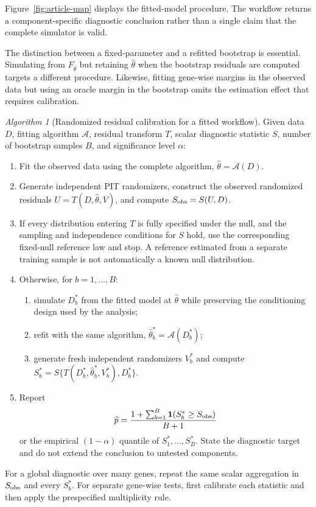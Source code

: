 \documentclass[preprint,12pt]{elsarticle}
\theoremstyle{plain}
\theoremstyle{remark}
\newtheorem{algorithm}{Algorithm}
\begin{document}
Figure~\ref{fig:article-map} displays the fitted-model procedure. The workflow
returns a component-specific diagnostic conclusion rather than a single claim
that the complete simulator is valid.

The distinction between a fixed-parameter and a refitted bootstrap is
essential. Simulating from $F_{\widehat\theta}$ but retaining
$\widehat\theta$ when the bootstrap residuals are computed targets a different
procedure. Likewise, fitting gene-wise margins in the observed data but using
an oracle margin in the bootstrap omits the estimation effect that requires
calibration.

\par\noindent
\begin{minipage}{\linewidth}
\begin{algorithm}[Randomized residual calibration for a fitted workflow]
\label{alg:workflow}
Given data $D$, fitting algorithm $\mathcal A$, residual transform $T$, scalar
diagnostic statistic $S$, number of bootstrap samples $B$, and significance
level $\alpha$:
\begin{enumerate}
\item Fit the observed data using the complete algorithm,
$\widehat\theta=\mathcal A(D)$.
\item Generate independent PIT randomizers, construct the observed randomized
residuals $U=T(D,\widehat\theta,V)$, and compute $S_{\rm obs}=S(U,D)$.
\item If every distribution entering $T$ is fully specified under the null,
and the sampling and independence conditions for $S$ hold, use the
corresponding fixed-null reference law and stop. A reference estimated from a
separate training sample is not automatically a known null distribution.
\item Otherwise, for $b=1,\ldots,B$:
  \begin{enumerate}
  \item simulate $D_b^*$ from the fitted model at $\widehat\theta$ while
  preserving the conditioning design used by the analysis;
  \item refit with the same algorithm,
  $\widehat\theta_b^*=\mathcal A(D_b^*)$;
  \item generate fresh independent randomizers $V_b^*$ and compute
  $S_b^*=S\{T(D_b^*,\widehat\theta_b^*,V_b^*),D_b^*\}$.
  \end{enumerate}
\item Report
\[
\widehat p=\frac{1+\sum_{b=1}^B\mathbf 1(S_b^*\ge S_{\rm obs})}{B+1}
\]
or the empirical $(1-\alpha)$ quantile of $S_1^*,\ldots,S_B^*$. State the
diagnostic target and do not extend the conclusion to untested components.
\end{enumerate}
For a global diagnostic over many genes, repeat the same scalar aggregation
in $S_{\rm obs}$ and every $S_b^*$. For separate gene-wise tests, first
calibrate each statistic and then apply the prespecified multiplicity rule.
\end{algorithm}
\end{minipage}
\par
\end{document}
